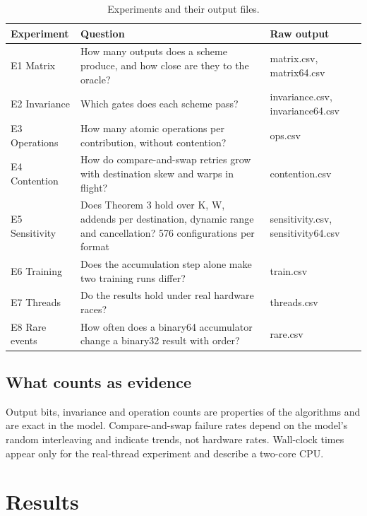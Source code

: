 \documentclass[3p,10pt]{elsarticle}
\begin{document}
\begin{table}[!htbp]\centering\small\setlength{\tabcolsep}{4pt}
\caption{Experiments and their output files.}\label{tab:11}
\begin{tabularx}{\linewidth}{>{\raggedright\arraybackslash\hsize=0.517\hsize}X>{\raggedright\arraybackslash\hsize=1.310\hsize}X>{\raggedright\arraybackslash\hsize=1.172\hsize}X}
\toprule
Experiment & Question & Raw output \\
\midrule
E1 Matrix & How many outputs does a scheme produce, and how close are they to the
oracle? & matrix.csv, matrix64.csv \\
E2 Invariance & Which gates does each scheme pass? & invariance.csv, invariance64.csv \\
E3 Operations & How many atomic operations per contribution, without contention? & ops.csv \\
E4 Contention & How do compare-and-swap retries grow with destination skew and warps in
flight? & contention.csv \\
E5 Sensitivity & Does Theorem 3 hold over K, W, addends per destination, dynamic range
and cancellation? 576 configurations per format & sensitivity.csv, sensitivity64.csv \\
E6 Training & Does the accumulation step alone make two training runs differ? & train.csv \\
E7 Threads & Do the results hold under real hardware races? & threads.csv \\
E8 Rare events & How often does a binary64 accumulator change a binary32 result with
order? & rare.csv \\
\bottomrule
\end{tabularx}
\end{table}

\hypertarget{what-counts-as-evidence}{%
\subsection{What counts as evidence}\label{what-counts-as-evidence}}

Output bits, invariance and operation counts are properties of the
algorithms and are exact in the model. Compare-and-swap failure rates
depend on the model's random interleaving and indicate trends, not
hardware rates. Wall-clock times appear only for the real-thread
experiment and describe a two-core CPU.

\hypertarget{results}{%
\section{Results}\label{results}}
\end{document}
